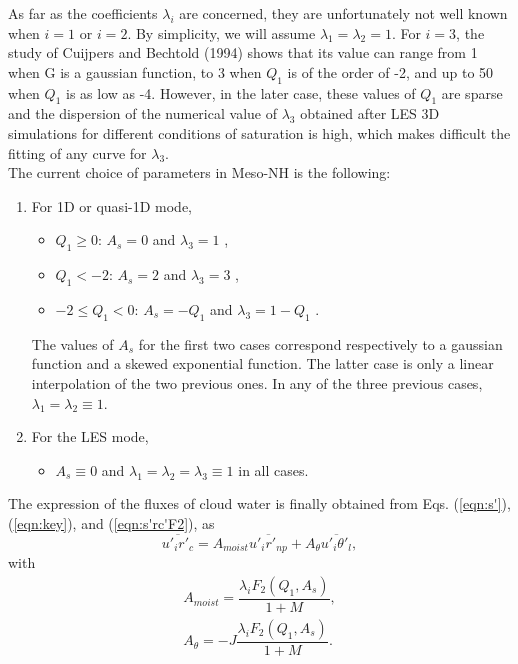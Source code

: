 As far as the coefficients ${\lambda}_{i}$ are concerned, they are unfortunately
not well known when $i = 1$ or $i = 2$.  By simplicity, we will assume
${\lambda}_{1} = {\lambda}_{2} = 1$.  For $i = 3$, the study of
Cuijpers and Bechtold (1994) shows that its value can range from 1 when G is
a gaussian function, to 3 when $Q_{1}$ is of the order of -2, and up to 50 when
$Q_{1}$ is as low as -4.  However, in the later case, these values of $Q_{1}$
are sparse and the dispersion of the numerical value of
${\lambda}_{3}$ obtained after LES 3D simulations for different conditions of
saturation is high, which makes difficult
the fitting of any curve for ${\lambda}_{3}$. \\

The current choice of parameters in Meso-NH is the following:
\begin{enumerate}
\item For 1D or quasi-1D mode,
\begin{itemize}
\item $Q_{1} \geq 0$: $A_{s} = 0$ and ${\lambda}_{3} = 1$ ,
\item $Q_{1} < -2$: $A_{s} = 2$ and ${\lambda}_{3} = 3$ ,
\item $-2 \leq Q_{1} < 0$: $A_{s} = -Q_{1}$ and ${\lambda}_{3} = 1-Q_{1}$ .
\end{itemize}
The values of $A_{s}$ for the first two cases correspond respectively to
a gaussian function and a skewed exponential function.
The latter case is only a linear interpolation of the two previous ones.  In any
of the three previous cases, $\lambda_1=\lambda_2 \equiv 1$.
\item For the LES mode,
\begin{itemize}
\item $A_{s} \equiv 0$ and
$\lambda_1=\lambda_2=\lambda_3 \equiv 1$ in all cases.
\end{itemize}
\end{enumerate}

The expression of the fluxes of cloud water is finally obtained from
Eqs. (\ref{eqn:s'}), (\ref{eqn:key}), and (\ref{eqn:s'rc'F2}), as
\begin{equation}\label{equirc}
\overline{{u'_{i}}{r'_{c}}} = A_{moist} \overline{{u'_{i}}{r'_{np}}} +
A_{\theta} \overline{{u'_{i}}{{\theta}'_{l}}},
\end{equation}
with
\begin{eqnarray}\label{ArAtheta}
A_{moist} = \dfrac {\lambda_i F_2(Q_1,A_s)} {1+M}, \\
A_{\theta} = -J \dfrac {\lambda_i F_2(Q_1,A_s)} {1+M}.
\end{eqnarray}

